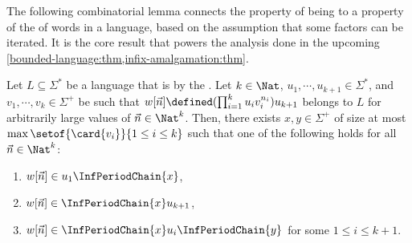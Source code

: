 The following combinatorial lemma connects the property of being
 to a property of the  of words in
a language, based on the assumption that some factors can be iterated. It is
the core result that powers the analysis done in the upcoming
\cref{bounded-language:thm,infix-amalgamation:thm}.

\begin{lemma}
    \label{pumping-periods:lem}
    Let $L \subseteq \Sigma^*$ be a language
    that is  by the .
    Let $k \in \Nat$, $u_1, \cdots, u_{k+1} \in \Sigma^*$,
    and $v_1, \cdots, v_{k} \in \Sigma^+$
    be such that
    $w[\vec{n}] \defined (\prod_{i = 1}^k u_i v_i^{n_i}) u_{k+1}$
    belongs to $L$
    for arbitrarily large values of $\vec{n} \in \Nat^k$.
    Then, 
    there exists $x,y \in \Sigma^+$ of size 
    at most $\max \setof{\card{v_i}}{1 \leq i \leq k}$
    such that 
    one of the following holds for all
    $\vec{n} \in \Nat^{k}$:
    \begin{enumerate}
        \item $w[\vec{n}] \in u_1 \InfPeriodChain{x}$,
        \item $w[\vec{n}] \in \InfPeriodChain{x} u_{k+1}$,
        \item $w[\vec{n}] \in \InfPeriodChain{x} u_i \InfPeriodChain{y}$
            for some $1 \leq i \leq k + 1$.

    \end{enumerate}
\end{lemma}

